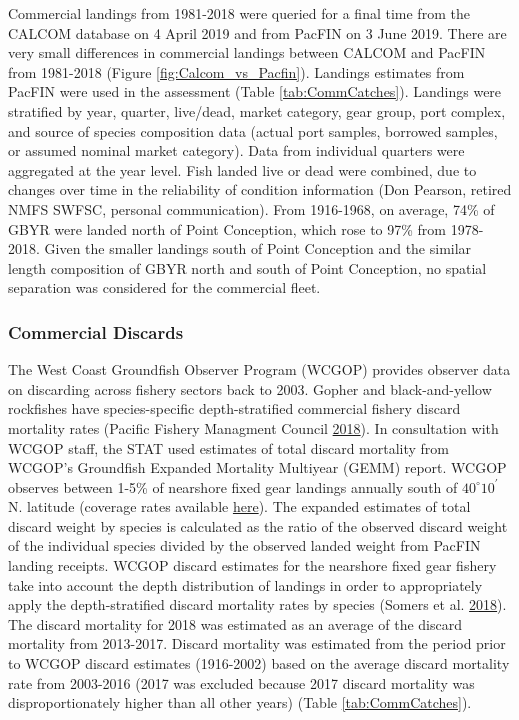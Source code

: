\documentclass[12pt,]{article}
\begin{document}
Commercial landings from 1981-2018 were queried for a final time from
the CALCOM database on 4 April 2019 and from PacFIN on 3 June 2019.
There are very small differences in commercial landings between CALCOM
and PacFIN from 1981-2018 (Figure \ref{fig:Calcom_vs_Pacfin}). Landings
estimates from PacFIN were used in the assessment (Table
\ref{tab:CommCatches}). Landings were stratified by year, quarter,
live/dead, market category, gear group, port complex, and source of
species composition data (actual port samples, borrowed samples, or
assumed nominal market category). Data from individual quarters were
aggregated at the year level. Fish landed live or dead were combined,
due to changes over time in the reliability of condition information
(Don Pearson, retired NMFS SWFSC, personal communication). From
1916-1968, on average, 74\% of GBYR were landed north of Point
Conception, which rose to 97\% from 1978-2018. Given the smaller
landings south of Point Conception and the similar length composition of
GBYR north and south of Point Conception, no spatial separation was
considered for the commercial fleet.

\subsubsection{Commercial Discards}\label{commercial-discards}

The West Coast Groundfish Observer Program (WCGOP) provides observer
data on discarding across fishery sectors back to 2003. Gopher and
black-and-yellow rockfishes have species-specific depth-stratified
commercial fishery discard mortality rates (Pacific Fishery Managment
Council \protect\hyperlink{ref-PSMFC2018}{2018}). In consultation with
WCGOP staff, the STAT used estimates of total discard mortality from
WCGOP's Groundfish Expanded Mortality Multiyear (GEMM) report. WCGOP
observes between 1-5\% of nearshore fixed gear landings annually south
of \(40^\circ 10^\prime\) N. latitude (coverage rates available
\href{https://www.nwfsc.noaa.gov/research/divisions/fram/observation/data_products/sector_products.cfm\#ob}{here}).
The expanded estimates of total discard weight by species is calculated
as the ratio of the observed discard weight of the individual species
divided by the observed landed weight from PacFIN landing receipts.
WCGOP discard estimates for the nearshore fixed gear fishery take into
account the depth distribution of landings in order to appropriately
apply the depth-stratified discard mortality rates by species (Somers et
al. \protect\hyperlink{ref-Somers2018}{2018}). The discard mortality for
2018 was estimated as an average of the discard mortality from
2013-2017. Discard mortality was estimated from the period prior to
WCGOP discard estimates (1916-2002) based on the average discard
mortality rate from 2003-2016 (2017 was excluded because 2017 discard
mortality was disproportionately higher than all other years) (Table
\ref{tab:CommCatches}).
\end{document}
